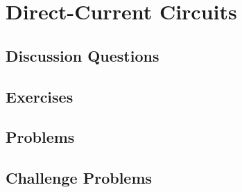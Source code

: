 
\chapter{Direct-Current Circuits}

\section{Discussion Questions}

\section{Exercises}

\section{Problems}

\section{Challenge Problems}
